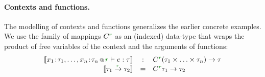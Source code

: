 \paragraph{Contexts and functions.}
The modelling of contexts and functions generalizes the earlier concrete examples. We use the 
family of mappings $\ctyp{\cclrd{r}}{}$ as an (indexed) data-type that wraps the product of 
free variables of the context and the arguments of functions:
%
\begin{equation*}
\begin{array}{rcl}
\sem{\coctx{x_1\!:\!\tau_1, \ldots, x_n\!:\!\tau_n}{ \cclrd{r} } \vdash e : \tau} 
  &:& \ctyp{\cclrd{r}}{(\tau_1 \times \ldots \times \tau_n)} \rightarrow \tau\\
\sem{\tau_1 \xrightarrow{\cclrd{r}} \tau_2} &=& \ctyp{\cclrd{r}}{\tau_1} \rightarrow \tau_2
\end{array}
\end{equation*}


